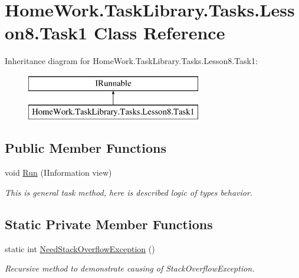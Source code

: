 \hypertarget{class_home_work_1_1_task_library_1_1_tasks_1_1_lesson8_1_1_task1}{}\section{Home\+Work.\+Task\+Library.\+Tasks.\+Lesson8.\+Task1 Class Reference}
\label{class_home_work_1_1_task_library_1_1_tasks_1_1_lesson8_1_1_task1}
Inheritance diagram for Home\+Work.\+Task\+Library.\+Tasks.\+Lesson8.\+Task1\+:\begin{figure}[H]
\begin{center}
\leavevmode
\includegraphics[height=2.000000cm]{class_home_work_1_1_task_library_1_1_tasks_1_1_lesson8_1_1_task1}
\end{center}
\end{figure}
\subsection*{Public Member Functions}
\begin{DoxyCompactItemize}
\item 
void \mbox{\hyperlink{class_home_work_1_1_task_library_1_1_tasks_1_1_lesson8_1_1_task1_a0ae35ade48627a664813b52b10df144f}{Run}} (I\+Information view)
\begin{DoxyCompactList}\small\item\em This is general task method, here is described logic of types behavior. \end{DoxyCompactList}\end{DoxyCompactItemize}
\subsection*{Static Private Member Functions}
\begin{DoxyCompactItemize}
\item 
static int \mbox{\hyperlink{class_home_work_1_1_task_library_1_1_tasks_1_1_lesson8_1_1_task1_abb84605768fe4e2f7e46fdaf0aea10d9}{Need\+Stack\+Overflow\+Exception}} ()
\begin{DoxyCompactList}\small\item\em Recursive method to demonstrate causing of Stack\+Overflow\+Exception. \end{DoxyCompactList}\end{DoxyCompactItemize}


